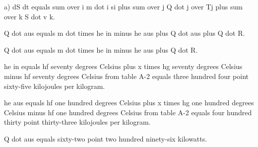 a) dS dt equals sum over i m dot i si plus sum over j Q dot j over Tj plus sum over k S dot v k.

Q dot aus equals m dot times he in minus he aus plus Q dot aus plus Q dot R.

Q dot aus equals m dot times he in minus he aus plus Q dot R.

he in equals hf seventy degrees Celsius plus x times hg seventy degrees Celsius minus hf seventy degrees Celsius from table A-2 equals three hundred four point sixty-five kilojoules per kilogram.

he aus equals hf one hundred degrees Celsius plus x times hg one hundred degrees Celsius minus hf one hundred degrees Celsius from table A-2 equals four hundred thirty point thirty-three kilojoules per kilogram.

Q dot aus equals sixty-two point two hundred ninety-six kilowatts.